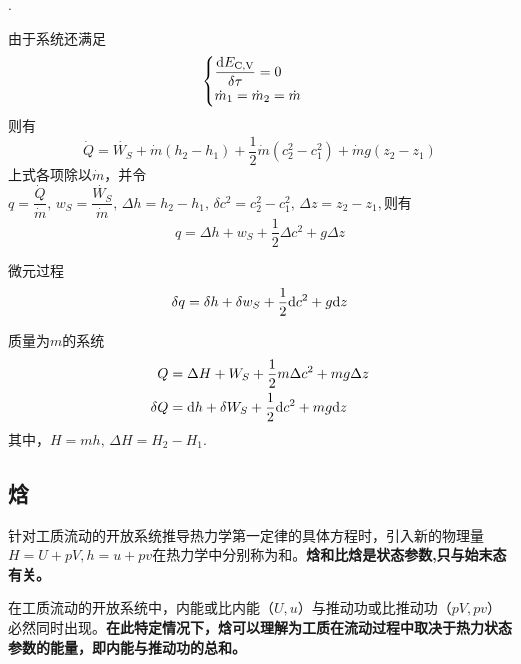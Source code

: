 . \dya[稳定流动的开放系统]
\par 由于系统还满足
\begin{equation}
	\begin{cases}
		\dfrac{{\rm{d}} E_{\text{C,V}}}{\delta \tau} = 0\\
		\dot{m}_1 = \dot{m}_2 = \dot{m}
	\end{cases}
\end{equation}
则有
\begin{equation}
	\dot{Q} = \dot{W_S}+\dot{m}(h_2 - h_1) + \frac{1}{2} \dot{m}\left(c_2^2 -c_1^2\right) + \dot{m}g(z_2-z_1)
\end{equation}
上式各项除以$\dot{m}$，并令$q = \dfrac{\dot{Q}}{\dot{m}},\, w_S = \dfrac{\dot{W_S}}{\dot{m}},\, \Delta h = h_2 - h_1, \, \delta c^2 =c_2^2 - c_1^2,\, \Delta z = z_2 - z_1,$则有
\begin{equation}
	q = \Delta h + w_S + \frac{1}{2}\Delta c^2 + g \Delta z
\end{equation}
\begin{myitemize}
	\item 微元过程
	\begin{equation}
		\delta q = \delta h + \delta w_S + \frac 12 {\rm{d}} c^2 + g {\rm{d}} z
	\end{equation}
	\item 质量为$m$的系统
	\begin{align}
	Q &= \Delta H + W_S + \frac 12 m \Delta c^2 + mg \Delta z\\
	\delta Q & = {\rm{d}} h + \delta W_S + \frac 12  {\rm{d}} c^2 + mg {\rm{d}} z
\end{align}
其中，$H=mh, \, \Delta H = H_2 -H_1.$
\end{myitemize}
\vspace*{1em}
\subsection{焓}
\tdefination[焓和比焓]
针对工质流动的开放系统推导热力学第一定律的具体方程时，引入新的物理量$H=U+pV, h = u+pv$在热力学中分别称为和。\textbf{焓和比焓是状态参数,只与始末态有关。}
\begin{itemizea}
\item 在工质流动的开放系统中，内能或比内能（$U,u$）与推动功或比推动功（$pV,pv$）必然同时出现。\textbf{在此特定情况下，焓可以理解为工质在流动过程中取决于热力状态参数的能量，即内能与推动功的总和。}	\vspace*{0.3em}
\end{itemizea}

